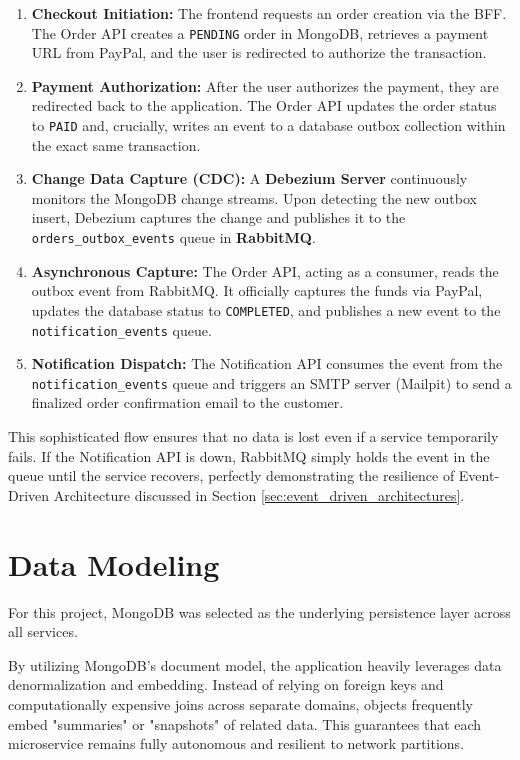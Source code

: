\begin{enumerate}
    \item \textbf{Checkout Initiation:} The frontend requests an order creation via the \gls{BFF}. The Order API creates a \texttt{PENDING} order in MongoDB, retrieves a payment URL from PayPal, and the user is redirected to authorize the transaction.
    \item \textbf{Payment Authorization:} After the user authorizes the payment, they are redirected back to the application. The Order API updates the order status to \texttt{PAID} and, crucially, writes an event to a database outbox collection within the exact same transaction.
    \item \textbf{Change Data Capture (CDC):} A \textbf{Debezium Server} continuously monitors the MongoDB change streams. Upon detecting the new outbox insert, Debezium captures the change and publishes it to the \texttt{orders\_outbox\_events} queue in \textbf{RabbitMQ}.
    \item \textbf{Asynchronous Capture:} The Order API, acting as a consumer, reads the outbox event from RabbitMQ. It officially captures the funds via PayPal, updates the database status to \texttt{COMPLETED}, and publishes a new event to the \texttt{notification\_events} queue.
    \item \textbf{Notification Dispatch:} The Notification API consumes the event from the \texttt{notification\_events} queue and triggers an SMTP server (Mailpit) to send a finalized order confirmation email to the customer.
\end{enumerate}

This sophisticated flow ensures that no data is lost even if a service temporarily fails. If the Notification API is down, RabbitMQ simply holds the event in the queue until the service recovers, perfectly demonstrating the resilience of Event-Driven Architecture discussed in Section \ref{sec:event_driven_architectures}.


\section{Data Modeling}
\label{sec:data_modeling}

For this project, MongoDB was selected as the underlying persistence layer across all services. 

By utilizing MongoDB's document model, the application heavily leverages data denormalization and embedding. Instead of relying on foreign keys and computationally expensive joins across separate domains, objects frequently embed "summaries" or "snapshots" of related data. This guarantees that each microservice remains fully autonomous and resilient to network partitions.

